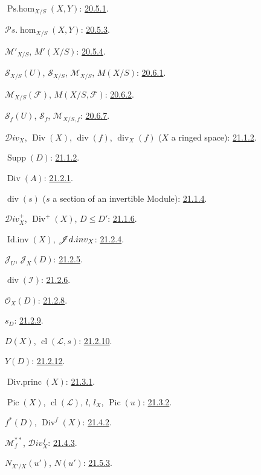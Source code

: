 $\operatorname{Ps.hom}_{X/S}(X,Y)$: {\hyperref[IV.20]{20.5.1}}.

$\mathcal P\!s.\operatorname{hom}_{X/S}(X,Y)$: {\hyperref[IV.20.5.3]{20.5.3}}.

$\mathcal M'_{X/S}$, $M'(X/S)$: {\hyperref[IV.20]{20.5.4}}.

$\mathcal S_{X/S}(U)$, $\mathcal S_{X/S}$, $\mathcal M_{X/S}$,
$M(X/S)$: {\hyperref[IV.20]{20.6.1}}.

$\mathcal M_{X/S}(\mathcal F)$, $M(X/S,\mathcal F)$:
{\hyperref[IV.20]{20.6.2}}.

$\mathcal S_f(U)$, $\mathcal S_f$, $\mathcal M_{X/S,f}$:
{\hyperref[IV.20]{20.6.7}}.

$\mathcal{D}iv_X$, $\operatorname{Div}(X)$, $\operatorname{div}(f)$,
$\operatorname{div}_X(f)$ ($X$ a ringed space): {\hyperref[IV.21.1.2]{21.1.2}}.

$\operatorname{Supp}(D)$: {\hyperref[IV.21.1.2]{21.1.2}}.

$\operatorname{Div}(A)$: {\hyperref[IV.21.2.1]{21.2.1}}.

$\operatorname{div}(s)$ ($s$ a section of an invertible Module):
{\hyperref[IV.21.1.4]{21.1.4}}.

$\mathcal{D}iv_X^+$, $\operatorname{Div}^+(X)$, $D\leq D'$:
{\hyperref[IV.21.1.6]{21.1.6}}.

$\operatorname{Id.inv}(X)$, $\mathscr{J}d.inv_X$:
{\hyperref[IV.21.2.4]{21.2.4}}.

$\mathcal J_U$, $\mathcal J_X(D)$: {\hyperref[IV.21.2.5]{21.2.5}}.

$\operatorname{div}(\mathcal I)$: {\hyperref[IV.21.2.6]{21.2.6}}.

$\mathcal O_X(D)$: {\hyperref[IV.21.2.8]{21.2.8}}.

$s_D$: {\hyperref[IV.21.2.9]{21.2.9}}.

$D(X)$, $\operatorname{cl}(\mathcal L,s)$: {\hyperref[IV.21.2.10]{21.2.10}}.

$Y(D)$: {\hyperref[IV.21.2.12]{21.2.12}}.

$\operatorname{Div.princ}(X)$: {\hyperref[IV.21.3.1]{21.3.1}}.

$\operatorname{Pic}(X)$, $\operatorname{cl}(\mathcal L)$, $l$, $l_X$,
$\operatorname{Pic}(u)$: {\hyperref[IV.21.3.2]{21.3.2}}.

$f^*(D)$, $\operatorname{Div}^f(X)$: {\hyperref[IV.21.4.2]{21.4.2}}.

$\mathcal M_f^{**}$, $\mathcal{D}iv_X^f$: {\hyperref[IV.21.4.3]{21.4.3}}.

$N_{X'/X}(u')$, $N(u')$: {\hyperref[IV.21.5.3]{21.5.3}}.

